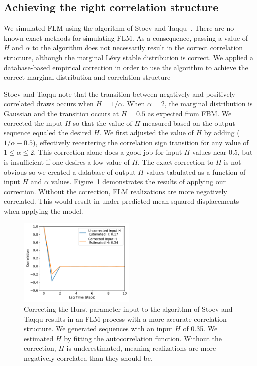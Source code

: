 \documentclass{article}
\begin{document}
  \subsection{Achieving the right correlation structure}\label{section:flm_correlation}
  
  We simulated FLM using the algorithm of Stoev and Taqqu~\cite{stoev_simulation_2004}.
  There are no known exact methods for simulating FLM. As a consequence, passing a
  value of $H$ and $\alpha$ to the algorithm does not necessarily result in the correct
  correlation structure, although the marginal L\'evy stable distribution is correct. 
  We applied a database-based empirical correction in order to use the
  algorithm to achieve the correct marginal distribution and correlation structure.
  
  Stoev and Taqqu note that the transition between negatively and positively correlated
  draws occurs when $H = 1/ \alpha$. When $\alpha=2$, the marginal distribution is 
  Gaussian and the transition occurs at $H=0.5$ as expected from FBM. We corrected 
  the input $H$ so that the value of $H$ measured based on the output sequence equaled
  the desired $H$. We first adjusted the value of $H$ by adding ($1 / \alpha - 0.5$),
  effectively recentering the correlation sign transition for any value of $1 \leq \alpha \leq 2$.
  This correction alone does a good job for input $H$ values near 0.5, but is
  insufficient if one desires a low value of $H$. The exact correction to $H$ is 
  not obvious so we created a database of output $H$ values tabulated as a function
  of input $H$ and $\alpha$ values. Figure~\ref{fig:hurst_correction} demonstrates the
  results of applying our correction. Without the correction, FLM realizations are
  more negatively correlated. This would result in under-predicted mean squared
  displacements when applying the model.
  
  \begin{figure}
  \centering
  \includegraphics[width=0.5\textwidth]{hurst_correction.pdf}
  \caption{Correcting the Hurst parameter input to the algorithm of Stoev and Taqqu
  results in an FLM process with a more accurate correlation structure. We generated
  sequences with an input $H$ of 0.35. We estimated $H$ by fitting the autocorrelation
  function. Without the correction, $H$ is underestimated, meaning realizations are 
  more negatively correlated than they should be.}\label{fig:hurst_correction}
  \end{figure}
  
\end{document}
